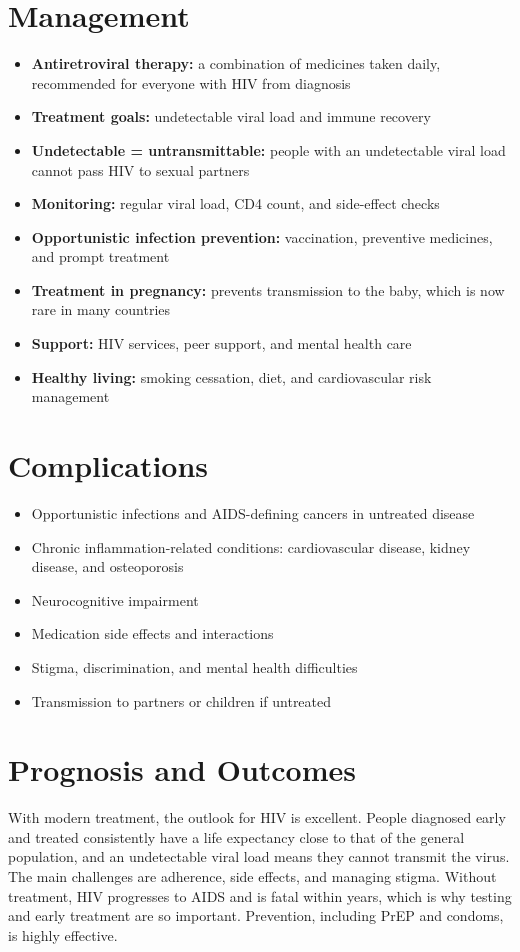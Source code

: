 \section*{Management}
\begin{itemize}
    \item \textbf{Antiretroviral therapy:} a combination of medicines taken daily, recommended for everyone with HIV from diagnosis
    \item \textbf{Treatment goals:} undetectable viral load and immune recovery
    \item \textbf{Undetectable = untransmittable:} people with an undetectable viral load cannot pass HIV to sexual partners
    \item \textbf{Monitoring:} regular viral load, CD4 count, and side-effect checks
    \item \textbf{Opportunistic infection prevention:} vaccination, preventive medicines, and prompt treatment
    \item \textbf{Treatment in pregnancy:} prevents transmission to the baby, which is now rare in many countries
    \item \textbf{Support:} HIV services, peer support, and mental health care
    \item \textbf{Healthy living:} smoking cessation, diet, and cardiovascular risk management
\end{itemize}

\section*{Complications}
\begin{itemize}
    \item Opportunistic infections and AIDS-defining cancers in untreated disease
    \item Chronic inflammation-related conditions: cardiovascular disease, kidney disease, and osteoporosis
    \item Neurocognitive impairment
    \item Medication side effects and interactions
    \item Stigma, discrimination, and mental health difficulties
    \item Transmission to partners or children if untreated
\end{itemize}

\section*{Prognosis and Outcomes}
With modern treatment, the outlook for HIV is excellent. People diagnosed early and treated consistently have a life expectancy close to that of the general population, and an undetectable viral load means they cannot transmit the virus. The main challenges are adherence, side effects, and managing stigma. Without treatment, HIV progresses to AIDS and is fatal within years, which is why testing and early treatment are so important. Prevention, including PrEP and condoms, is highly effective.

